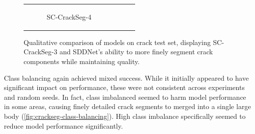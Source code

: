 \documentclass[a4paper,12pt]{report}
\begin{document}
\begin{figure}[htbp]
\begin{tabular}{cccc}
\begin{subfigure}[b]{0.23\textwidth}
            \caption{SC-CrackSeg-4}
            \label{fig:crackseg-experiment-qualitative-sc-crackseg-4}
        \end{subfigure}
    \end{tabular}
    \caption{Qualitative comparison of models on crack test set, displaying SC-CrackSeg-3 and SDDNet's ability to more finely segment crack components while maintaining quality.}
    \label{fig:crackseg-experiment-qualitative}
\end{figure}

Class balancing again achieved mixed success. While it initially appeared to have significant impact on performance, these were not consistent across experiments and random seeds. In fact, class imbalanced seemed to harm model performance in some areas, causing finely detailed crack segments to merged into a single large body (\autoref{fig:crackseg-class-balancing}). High class imbalance specifically seemed to reduce model performance significantly.
\end{document}
